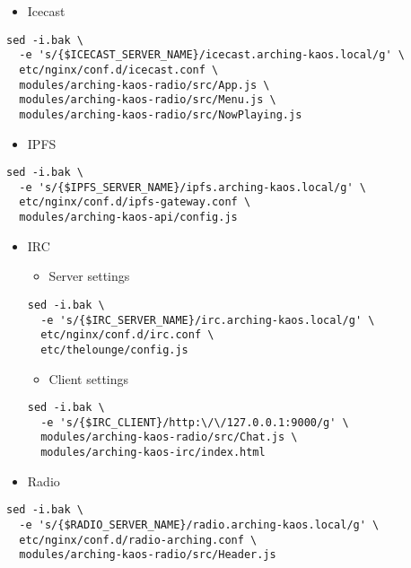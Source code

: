\documentclass[12pt]{report}
\begin{document}
\begin{itemize}

\item
  Icecast
\end{itemize}

\begin{verbatim}
sed -i.bak \
  -e 's/{$ICECAST_SERVER_NAME}/icecast.arching-kaos.local/g' \
  etc/nginx/conf.d/icecast.conf \
  modules/arching-kaos-radio/src/App.js \
  modules/arching-kaos-radio/src/Menu.js \
  modules/arching-kaos-radio/src/NowPlaying.js
\end{verbatim}

\begin{itemize}

\item
  IPFS
\end{itemize}

\begin{verbatim}
sed -i.bak \
  -e 's/{$IPFS_SERVER_NAME}/ipfs.arching-kaos.local/g' \
  etc/nginx/conf.d/ipfs-gateway.conf \
  modules/arching-kaos-api/config.js
\end{verbatim}

\begin{itemize}

\item
  IRC

  \begin{itemize}

  \item
  Server settings
  \end{itemize}

\begin{verbatim}
sed -i.bak \
  -e 's/{$IRC_SERVER_NAME}/irc.arching-kaos.local/g' \
  etc/nginx/conf.d/irc.conf \
  etc/thelounge/config.js
\end{verbatim}

  \begin{itemize}

  \item
  Client settings
  \end{itemize}

\begin{verbatim}
sed -i.bak \
  -e 's/{$IRC_CLIENT}/http:\/\/127.0.0.1:9000/g' \
  modules/arching-kaos-radio/src/Chat.js \
  modules/arching-kaos-irc/index.html
\end{verbatim}
\item
  Radio
\end{itemize}

\begin{verbatim}
sed -i.bak \
  -e 's/{$RADIO_SERVER_NAME}/radio.arching-kaos.local/g' \
  etc/nginx/conf.d/radio-arching.conf \
  modules/arching-kaos-radio/src/Header.js
\end{verbatim}
\end{document}
